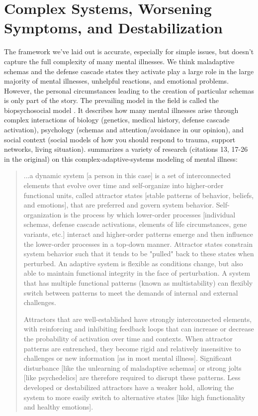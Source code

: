\documentclass[12pt,letterpaper]{book}
\begin{document}
\section{Complex Systems, Worsening Symptoms, and Destabilization}
\label{sec:complex}
The framework we've laid out is accurate, especially for simple issues, but doesn't capture the full complexity of many mental illnesses. We think maladaptive schemas and the defense cascade states they activate play a large role in the large majority of mental illnesses, unhelpful reactions, and emotional problems. However, the personal circumstances leading to the creation of particular schemas is only part of the story. The prevailing model in the field is called the biopsychosocial model \cite{engel1977need}. It describes how many mental illnesses arise through complex interactions of biology (genetics, medical history, defense cascade activation), psychology (schemas and attention/avoidance in our opinion), and social context (social models of how you should respond to trauma, support networks, living situation). \textcite{hayes2020complex} summarizes a variety of research (citations 13, 17-26 in the original) on this complex-adaptive-systems modeling of mental illness:
\begin{quotation}
	...a dynamic system [a person in this case] is a set of interconnected elements that evolve over time and self-organize into higher-order functional units, called attractor states [stable patterns of behavior, beliefs, and emotions], that are preferred and govern system behavior. Self-organization is the process by which lower-order processes [individual schemas, defense cascade activations, elements of life circumstances, gene variants, etc.] interact and higher-order patterns emerge and then influence the lower-order processes in a top-down manner. Attractor states constrain system behavior such that it tends to be "pulled" back to these states when perturbed. An adaptive system is flexible as conditions change, but also able to maintain functional integrity in the face of perturbation. A system that has multiple functional patterns (known as multistability) can flexibly switch between patterns to meet the demands of internal and external challenges.
	
	Attractors that are well-established have strongly interconnected elements, with reinforcing and inhibiting feedback loops that can increase or decrease the probability of activation over time and contexts. When attractor patterns are entrenched, they become rigid and relatively insensitive to challenges or new information [as in most mental illness]. Significant disturbance [like the unlearning of maladaptive schemas] or strong jolts [like psychedelics] are therefore required to disrupt these patterns. Less developed or destabilized attractors have a weaker hold, allowing the system to more easily switch to alternative states [like high functionality and healthy emotions].
\end{quotation}
\end{document}
